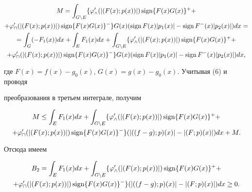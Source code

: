 \begin{multline*} 


M=\int_{G\setminus E}\{\varphi'_\wedge(|(F(x);p(x))|) 


\sign\{F(x)G(x)\}^+ +\\ 


% 


+\varphi'_\sqcap(|(F(x);p(x))|)\sign\{F(x)G(x)\}^-\} 


G(x)(\sign F(x)|p_1(x)|-\sign F^-(x)|p_2(x)|)dx= \\ 


% 


=\int_G(-F_1(x))dx+\int_E F_1(x)dx+\int_{G\setminus E} 


\{\varphi'_\wedge(|(F(x);p(x))|) 


\sign\{F(x)G(x)\}^+ +\\ 


% 


+\varphi'_\sqcap(|(F(x);p(x))|)\sign\{F(x)G(x)\}^-\} 


G(x)(\sign F(x)|p_1(x)|-\sign F^-(x)|p_2(x)|)dx, 


\end{multline*} 


где $F(x)=f(x)-g_0(x)$, $G(x)=g(x)-g_0(x)$. Учитывая (6) и проводя 


преобразования в третьем интеграле, получим 


\begin{multline*} 


M\le\int_E F_1(x)dx+\int_{G\setminus E} 


\{\varphi'_\wedge(|(F(x);p(x))|)\sign 


\{F(x)G(x)\}^+ + \\ 


% 


+\varphi'_\sqcap(|(F(x);p(x))|)\sign\{F(x)G(x)\}^-\} 


(|((f-g);p)(x)|-|(F;p)(x)|)dx+M. 


\end{multline*} 


Отсюда имеем 


\begin{multline*} 


B_2=\int_E F_1(x)dx+\int_{G\setminus E} 


\{\varphi'_\wedge(|(F(x);p(x))|)\sign\{F(x)G(x)\}^+ +\\ 


% 


+\varphi'_\sqcap(|(F(x);p(x))|)\sign\{F(x)G(x)\}^-\} 


(|((f-g);p)(x)|-|(F;p)(x)|)dx\ge0. 


\end{multline*} 


